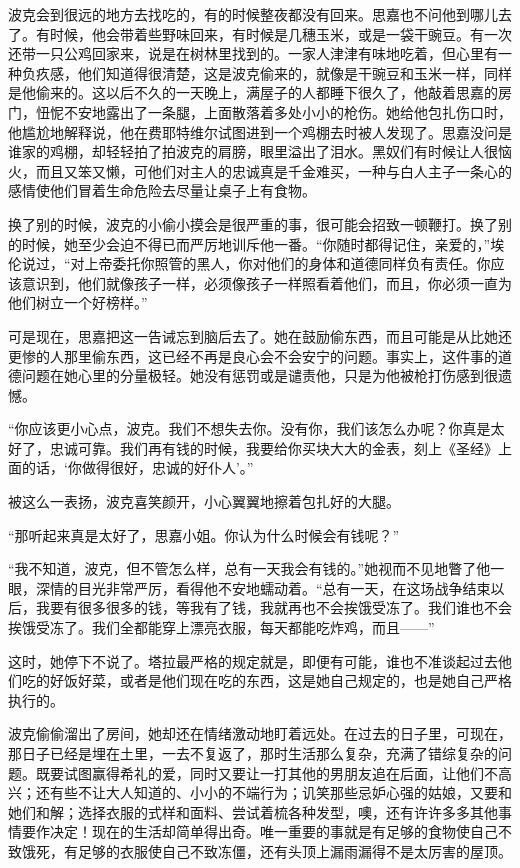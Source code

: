 \par 波克会到很远的地方去找吃的，有的时候整夜都没有回来。思嘉也不问他到哪儿去了。有时候，他会带着些野味回来，有时候是几穗玉米，或是一袋干豌豆。有一次还带一只公鸡回家来，说是在树林里找到的。一家人津津有味地吃着，但心里有一种负疚感，他们知道得很清楚，这是波克偷来的，就像是干豌豆和玉米一样，同样是他偷来的。这以后不久的一天晚上，满屋子的人都睡下很久了，他敲着思嘉的房门，忸怩不安地露出了一条腿，上面散落着多处小小的枪伤。她给他包扎伤口时，他尴尬地解释说，他在费耶特维尔试图进到一个鸡棚去时被人发现了。思嘉没问是谁家的鸡棚，却轻轻拍了拍波克的肩膀，眼里溢出了泪水。黑奴们有时候让人很恼火，而且又笨又懒，可他们对主人的忠诚真是千金难买，一种与白人主子一条心的感情使他们冒着生命危险去尽量让桌子上有食物。
\par 换了别的时候，波克的小偷小摸会是很严重的事，很可能会招致一顿鞭打。换了别的时候，她至少会迫不得已而严厉地训斥他一番。“你随时都得记住，亲爱的，”埃伦说过，“对上帝委托你照管的黑人，你对他们的身体和道德同样负有责任。你应该意识到，他们就像孩子一样，必须像孩子一样照看着他们，而且，你必须一直为他们树立一个好榜样。”
\par 可是现在，思嘉把这一告诫忘到脑后去了。她在鼓励偷东西，而且可能是从比她还更惨的人那里偷东西，这已经不再是良心会不会安宁的问题。事实上，这件事的道德问题在她心里的分量极轻。她没有惩罚或是谴责他，只是为他被枪打伤感到很遗憾。
\par “你应该更小心点，波克。我们不想失去你。没有你，我们该怎么办呢？你真是太好了，忠诚可靠。我们再有钱的时候，我要给你买块大大的金表，刻上《圣经》上面的话，‘你做得很好，忠诚的好仆人’。”
\par 被这么一表扬，波克喜笑颜开，小心翼翼地擦着包扎好的大腿。
\par “那听起来真是太好了，思嘉小姐。你认为什么时候会有钱呢？”
\par “我不知道，波克，但不管怎么样，总有一天我会有钱的。”她视而不见地瞥了他一眼，深情的目光非常严厉，看得他不安地蠕动着。“总有一天，在这场战争结束以后，我要有很多很多的钱，等我有了钱，我就再也不会挨饿受冻了。我们谁也不会挨饿受冻了。我们全都能穿上漂亮衣服，每天都能吃炸鸡，而且——”
\par 这时，她停下不说了。塔拉最严格的规定就是，即便有可能，谁也不准谈起过去他们吃的好饭好菜，或者是他们现在吃的东西，这是她自己规定的，也是她自己严格执行的。
\par 波克偷偷溜出了房间，她却还在情绪激动地盯着远处。在过去的日子里，可现在，那日子已经是埋在土里，一去不复返了，那时生活那么复杂，充满了错综复杂的问题。既要试图赢得希礼的爱，同时又要让一打其他的男朋友追在后面，让他们不高兴；还有些不让大人知道的、小小的不端行为；讥笑那些忌妒心强的姑娘，又要和她们和解；选择衣服的式样和面料、尝试着梳各种发型，噢，还有许许多多其他事情要作决定！现在的生活却简单得出奇。唯一重要的事就是有足够的食物使自己不致饿死，有足够的衣服使自己不致冻僵，还有头顶上漏雨漏得不是太厉害的屋顶。
